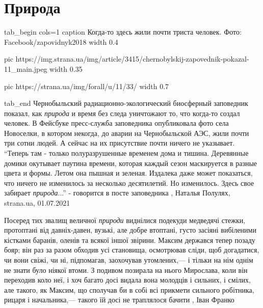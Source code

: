 
 
 
 
 
\chapter{Природа}
\label{sec:slova.priroda}

\ifcmt
  tab_begin cols=1
     caption Когда-то здесь жили почти триста человек. Фото: Facebook/zapovidnyk2018
     width 0.4

     pic https://img.strana.ua/img/article/3415/chernobylskij-zapovednik-pokazal-11_main.jpeg
     width 0.35

     pic https://strana.ua/img/forall/u/11/33/%
     width 0.7

  tab_end
\fi
Чернобыльский радиационно-экологический биосферный заповедник показал,
как \emph{природа} и время без следа уничтожают то, что когда-то создал человек.  В
Фейсбуке пресс-служба заповедника опубликовала фото села Новоселки, в котором
некогда, до аварии на Чернобыльской АЭС, жили почти три сотни людей. А сейчас
на их присутствие почти ничего не указывает. \enquote{Теперь там - только
полуразрушенные временем дома и тишина. Деревянные домики окутывает паутина
времени, которая каждый сезон маскируется в разные цвета и формы. Летом она
пышная и зеленая. Издалека даже может показаться, что ничего не изменилось за
несколько десятилетий. Но изменилось. Здесь свое забирает \emph{природа}...} -
говорится в посте заповедника
, 
Наталья Полулях, strana.ua, 01.07.2021

Посеред тих звалищ величної \emph{природи} виднілися подекуди медведячі стежки,
протоптані від давніх-давен, вузькі, але добре втоптані, густо засіяні
вибіленими кістками баранів, оленів та всякої іншої звірини. Максим держався
тепер позаду бояр; він раз за разом обходив усі становища, осмотрював сліди,
щоб догадатися, чи вони свіжі, чи ні, підпомагав, заохочував утомлених,— і
тільки на нім однім не знати було ніякої втоми. З подивом позирала на нього
Мирослава, коли він переходив коло неї, і хоч багато досі видала вона молодців
і сильних, і смілих, але такого, як Максим, що сполучав би в собі всі прикмети
сильного робітника, рицаря і начальника,— такого їй досі не траплялося бачити
, Іван Франко

